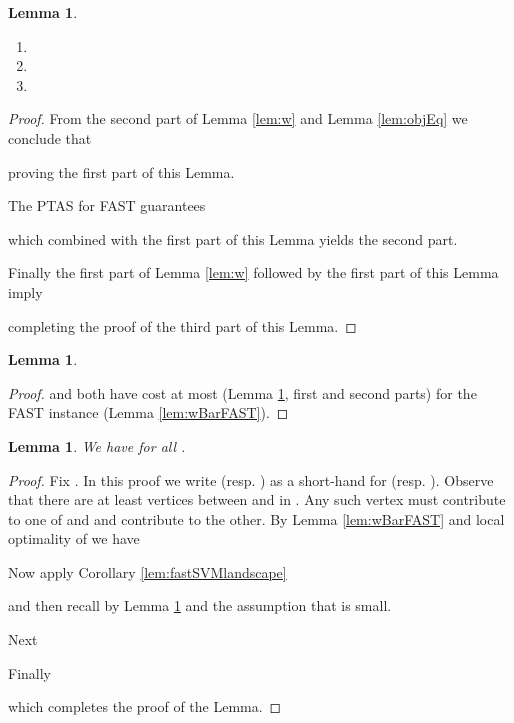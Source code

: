 \documentclass[dvips,11pt,letter]{article}
\newtheorem{lemma}[theorem]{Lemma}
\begin{document}
{\begin{lemma}\label{lem:fastCheap} 
\begin{enumerate}
\item 

\item

\item

\end{enumerate}
\end{lemma}
\begin{proof}
From the second part of Lemma \ref{lem:w} and Lemma \ref{lem:objEq} we conclude that

proving the first part of this Lemma.

The PTAS for FAST guarantees

which combined with the first part  of this Lemma yields the second part.

Finally the first part of Lemma \ref{lem:w} followed by the first part of this Lemma imply

completing the proof of the third part of this Lemma.
\end{proof}

\begin{lemma}\label{lem:Dsmall}

\end{lemma}
\begin{proof}
 and  both have cost at most  (Lemma \ref{lem:fastCheap}, first and second parts) for the FAST instance  (Lemma \ref{lem:wBarFAST}).
\end{proof}

\begin{lemma}\label{lem:23close}
We have
 for all .
\end{lemma}
\begin{proof}
Fix . In this proof we write  (resp. ) as a short-hand for  (resp. ). Observe that there are at least  vertices between  and  in . Any such vertex  must contribute  to one of  and  and contribute  to the other.
By Lemma \ref{lem:wBarFAST} and local optimality of  we have


Now apply Corollary \ref{lem:fastSVMlandscape}

and then recall  by Lemma \ref{lem:Dsmall} and the assumption that  is small.

Next

Finally

which completes the proof of the Lemma.
\end{proof}

}
\end{document}
